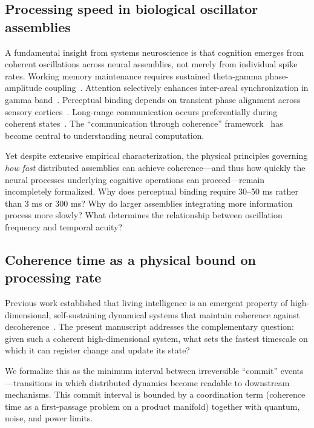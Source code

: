 \documentclass[12pt]{article}
\begin{document}
\subsection{Processing speed in biological oscillator assemblies}

A fundamental insight from systems neuroscience is that cognition emerges from coherent oscillations across neural assemblies, not merely from individual spike rates. Working memory maintenance requires sustained theta-gamma phase-amplitude coupling~\cite{miller2018,lisman2013}. Attention selectively enhances inter-areal synchronization in gamma band~\cite{fries2015,womelsdorf2007}. Perceptual binding depends on transient phase alignment across sensory cortices~\cite{singer1999,engel2001}. Long-range communication occurs preferentially during coherent states~\cite{varela2001}. The ``communication through coherence'' framework~\cite{fries2005} has become central to understanding neural computation.

Yet despite extensive empirical characterization, the physical principles governing \emph{how fast} distributed assemblies can achieve coherence---and thus how quickly the neural processes underlying cognitive operations can proceed---remain incompletely formalized. Why does perceptual binding require 30--50 ms rather than 3 ms or 300 ms? Why do larger assemblies integrating more information process more slowly? What determines the relationship between oscillation frequency and temporal acuity?

\subsection{Coherence time as a physical bound on processing rate}

Previous work established that living intelligence is an emergent property of high-dimensional, self-sustaining dynamical systems that maintain coherence against decoherence~\cite{todd2025intelligence}. The present manuscript addresses the complementary question: given such a coherent high-dimensional system, what sets the fastest timescale on which it can register change and update its state?

We formalize this as the minimum interval between irreversible ``commit'' events---transitions in which distributed dynamics become readable to downstream mechanisms. This commit interval is bounded by a coordination term (coherence time as a first-passage problem on a product manifold) together with quantum, noise, and power limits.
\end{document}
